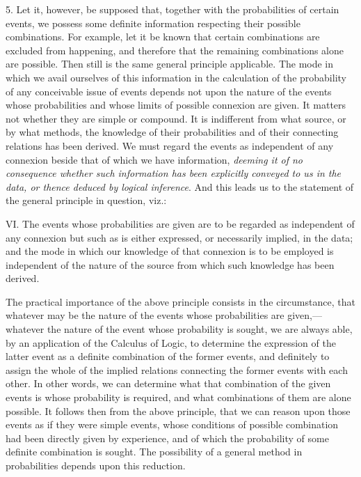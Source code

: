 \documentclass[oneside]{book}
\begin{document}
5. Let it, however, be supposed that, together with the probabilities
of certain events, we possess some definite information
respecting their possible combinations. For example, let it be
known that certain combinations are excluded from happening,
and therefore that the remaining combinations alone are possible.
Then still is the same general principle applicable. The mode
in which we avail ourselves of this information in the calculation
of the probability of any conceivable issue of events depends not
upon the nature of the events whose probabilities and whose
limits of possible connexion are given. It matters not whether
they are simple or compound. It is indifferent from what source,
or by what methods, the knowledge of their probabilities and of
their connecting relations has been derived. We must regard
the events as independent of any connexion beside that of which
we have information, \emph{deeming it of no consequence whether such information
has been explicitly conveyed to us in the data, or thence
deduced by logical inference}. And this leads us to the statement
of the general principle in question, viz.:

VI. The events whose probabilities are given are to be regarded
as independent of any connexion but such as is either
expressed, or necessarily implied, in the data; and the mode in
which our knowledge of that connexion is to be employed is independent
of the nature of the source from which such knowledge
has been derived.

The practical importance of the above principle consists
in the circumstance, that whatever may be the nature of the
events whose probabilities are given,---whatever the nature of
the event whose probability is sought, we are always able, by an
application of the Calculus of Logic, to determine the expression
of the latter event as a definite combination of the former events,
and definitely to assign the whole of the implied relations connecting
the former events with each other. In other words, we
can determine what that combination of the given events is whose
probability is required, and what combinations of them are alone
possible. It follows then from the above principle, that we can
reason upon those events as if they were simple events, whose
conditions of possible combination had been directly given by
experience, and of which the probability of some definite combination
is sought. The possibility of a general method in probabilities
depends upon this reduction.
\end{document}
